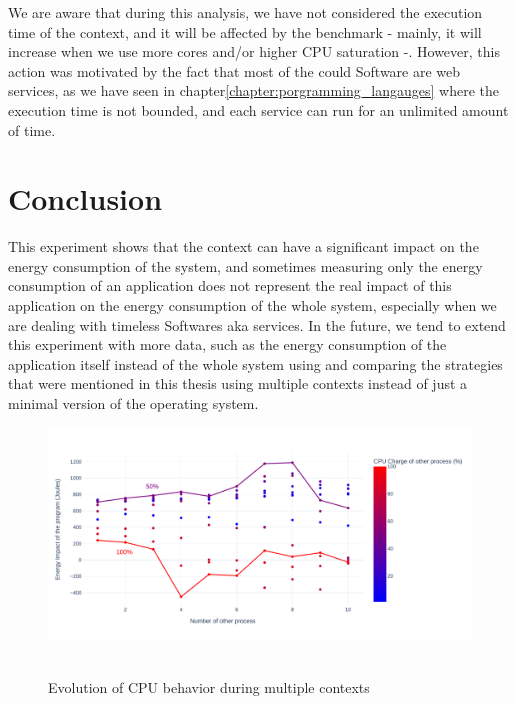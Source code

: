 We are aware that during this analysis, we have not considered the execution time of the context, and it will be affected by the benchmark - mainly, it will increase when we use more cores and/or higher CPU saturation -. However, this action was motivated by the fact that most of the could Software are web services, as we have seen in chapter\ref{chapter:porgramming_langauges} where the execution time is not bounded, and each service can run for an unlimited amount of time.

\section{Conclusion}
This experiment shows that the context can have a significant impact on the energy consumption of the system, and sometimes measuring only the energy consumption of an application does not represent the real impact of this application on the energy consumption of the whole system, especially when we are dealing with timeless Softwares aka services. 
In the future, we tend to extend this experiment with more data, such as the energy consumption of the application itself instead of the whole system using \cite{fieni2020smartwatts} and comparing the strategies that were mentioned in this thesis using multiple contexts instead of just a minimal version of the operating system.


\begin{figure}[!t]
      \centering
      \caption{Evolution of CPU behavior during multiple contexts }
      \includegraphics[width=\linewidth]{chapters/green_faas_impact}\
      \label{fig:green_faas_impact}
\end{figure}


\vfill \strut  %
\cleardoublepage